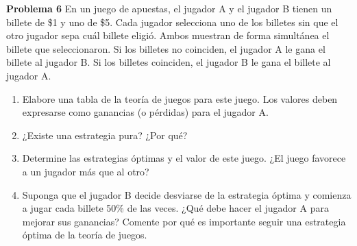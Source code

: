 \documentclass{article}
\begin{document}
\begin{problem}
\textbf{Problema 6}
En un juego de apuestas, el jugador A y el jugador B tienen un billete de \$1 y uno de \$5. Cada jugador selecciona uno de los billetes sin que el otro jugador sepa cuál billete eligió. Ambos muestran de forma simultánea el billete que seleccionaron. Si los billetes no coinciden, el jugador A le gana el billete al jugador B. Si los billetes coinciden, el jugador B le gana el billete al jugador A.

\begin{enumerate}
    \item Elabore una tabla de la teoría de juegos para este juego. Los valores deben expresarse como ganancias (o pérdidas) para el jugador A.
    \item ¿Existe una estrategia pura? ¿Por qué?
    \item Determine las estrategias óptimas y el valor de este juego. ¿El juego favorece a un jugador más que al otro?
    \item Suponga que el jugador B decide desviarse de la estrategia óptima y comienza a jugar cada billete 50\% de las veces. ¿Qué debe hacer el jugador A para mejorar sus ganancias? Comente por qué es importante seguir una estrategia óptima de la teoría de juegos.
\end{enumerate}
\end{problem}
\end{document}
